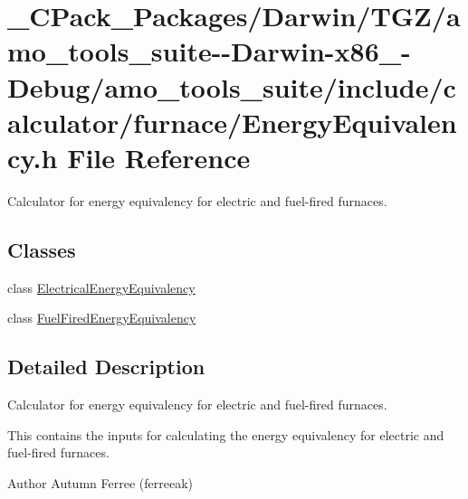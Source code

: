 \hypertarget{___c_pack___packages_2_darwin_2_t_g_z_2amo__tools__suite--_darwin-x86__64-_debug_2amo__tools__sucb43ef907d23efe0166c150256e0ece1}{}\section{\+\_\+\+C\+Pack\+\_\+\+Packages/\+Darwin/\+T\+G\+Z/amo\+\_\+tools\+\_\+suite-\/-\/\+Darwin-\/x86\+\_-\/\+Debug/amo\+\_\+tools\+\_\+suite/include/calculator/furnace/\+Energy\+Equivalency.h File Reference}
\label{___c_pack___packages_2_darwin_2_t_g_z_2amo__tools__suite--_darwin-x86__64-_debug_2amo__tools__sucb43ef907d23efe0166c150256e0ece1}


Calculator for energy equivalency for electric and fuel-\/fired furnaces.  


\subsection*{Classes}
\begin{DoxyCompactItemize}
\item 
class \hyperlink{class_electrical_energy_equivalency}{Electrical\+Energy\+Equivalency}
\item 
class \hyperlink{class_fuel_fired_energy_equivalency}{Fuel\+Fired\+Energy\+Equivalency}
\end{DoxyCompactItemize}


\subsection{Detailed Description}
Calculator for energy equivalency for electric and fuel-\/fired furnaces. 

This contains the inputs for calculating the energy equivalency for electric and fuel-\/fired furnaces.

\begin{DoxyAuthor}{Author}
Autumn Ferree (ferreeak) 
\end{DoxyAuthor}

